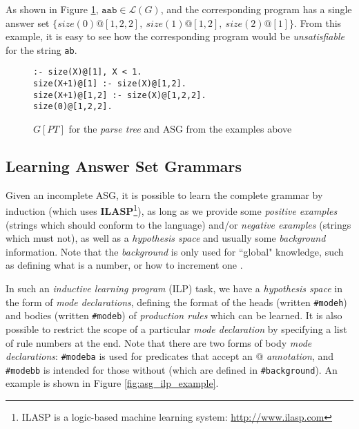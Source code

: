 As shown in Figure \ref{fig:asg_tree_program_example}, $\texttt{aab} \in \mathcal{L}(G)$, and the corresponding program has a single answer set $\{size(0)@[1,2,2],\ size(1)@[1,2],\ size(2)@[1]\}$. From this example, it is easy to see how the corresponding program would be \textit{unsatisfiable} for the string \texttt{ab}.

\begin{figure}[H]
\centering
\texttt{:- size(X)@[1], X < 1. \\
           size(X+1)@[1] :- size(X)@[1,2]. \\
           size(X+1)@[1,2] :- size(X)@[1,2,2]. \\
           size(0)@[1,2,2].}
\caption{$G[PT]$ for the \textit{parse tree} and ASG from the examples above}
\label{fig:asg_tree_program_example}
\end{figure}

\subsection*{Learning Answer Set Grammars}

Given an incomplete ASG, it is possible to learn the complete grammar by induction (which uses \textbf{ILASP}\footnote{ILASP is a logic-based machine learning system: \url{http://www.ilasp.com}}), as long as we provide some \textit{positive examples} (strings which should conform to the language) and/or \textit{negative examples}  (strings which must not), as well as a \textit{hypothesis space} and usually some \textit{background} information. Note that the \textit{background} is only used for ``global" knowledge, such as defining what is a number, or how to increment one \cite{law_representing_2019}.

In such an \textit{inductive learning program} (ILP) task, we have a \textit{hypothesis space} in the form of \textit{mode declarations}, defining the format of the heads (written \texttt{\#modeh}) and bodies (written \texttt{\#modeb}) of \textit{production rules} which can be learned. It is also possible to restrict the scope of a particular \textit{mode declaration} by specifying a list of rule numbers at the end. Note that there are two forms of body \textit{mode declarations}: \texttt{\#modeba} is used for predicates that accept an $@$ \textit{annotation}, and \texttt{\#modebb} is intended for those without (which are defined in \texttt{\#background}). An example is shown in Figure \ref{fig:asg_ilp_example}.

